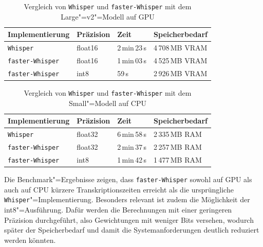 \begin{table}[H]
  \centering
  \caption{Vergleich von \texttt{Whisper} und \texttt{faster-Whisper} mit dem Large"=v2"=Modell auf GPU \autocite{FasterWhisper-Documentation}}
  \label{tab:vergleich-whisper-faster-whisper-large-v2}
  \begin{tabular}{l l l l}
    \toprule
    \textbf{Implementierung} & \textbf{Präzision} & \textbf{Zeit} & \textbf{Speicherbedarf} \\
    \midrule
    \texttt{Whisper}         & float16            & 2\,min\,23\,s & 4\,708\,MB VRAM         \\
    \texttt{faster-Whisper}  & float16            & 1\,min\,03\,s & 4\,525\,MB VRAM         \\
    \texttt{faster-Whisper}  & int8               & 59\,s         & 2\,926\,MB VRAM         \\
    \bottomrule
  \end{tabular}
\end{table}

\begin{table}[H]
  \centering
  \caption{Vergleich von \texttt{Whisper} und \texttt{faster-Whisper} mit dem Small"=Modell auf CPU \autocite{FasterWhisper-Documentation}}
  \label{tab:vergleich-whisper-faster-whisper-small}
  \begin{tabular}{l l l l}
    \toprule
    \textbf{Implementierung} & \textbf{Präzision} & \textbf{Zeit} & \textbf{Speicherbedarf} \\
    \midrule
    \texttt{Whisper}         & float32            & 6\,min\,58\,s & 2\,335\,MB RAM          \\
    \texttt{faster-Whisper}  & float32            & 2\,min\,37\,s & 2\,257\,MB RAM          \\
    \texttt{faster-Whisper}  & int8               & 1\,min\,42\,s & 1\,477\,MB RAM          \\
    \bottomrule
  \end{tabular}
\end{table}

Die Benchmark"=Ergebnisse zeigen, dass \texttt{faster-Whisper} sowohl auf GPU als auch auf CPU kürzere Transkriptionszeiten erreicht als die ursprüngliche \texttt{Whisper}"=Implementierung. Besonders relevant ist zudem die Möglichkeit der int8"=Ausführung. Dafür werden die Berechnungen mit einer geringeren Präzision durchgeführt, also Gewichtungen mit weniger Bits versehen, wodurch später der Speicherbedarf und damit die Systemanforderungen deutlich reduziert werden könnten.

